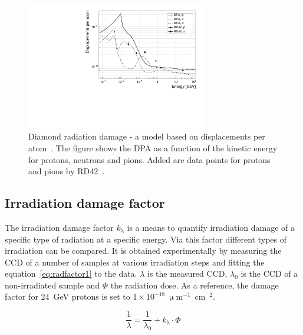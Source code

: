 \begin{figure}[!t]
\begin{center}
\includegraphics[width=0.7\textwidth]{03_measurement_results/scripts/plots/dpa1}
\caption{Diamond radiation damage - a model based on displacements per atom~\cite{Guthoff:2014223}. The figure shows the DPA as a function of the kinetic energy for protons, neutrons and pions. Added are data points for protons and pions by RD42~\cite{RD42IRRAD:00000}. %
}
\label{fig:kitdpa}
\end{center}
\end{figure}

\subsection{Irradiation damage factor}
The irradiation damage factor $k_\uplambda$ is a means to quantify irradiation damage of a specific type of radiation at a specific energy. Via this factor different types of irradiation can be compared. It is obtained experimentally by measuring the CCD of a number of samples at various irradiation steps and fitting the equation~\ref{eq:radfactor1} to the data. $\lambda$ is the measured CCD, $\lambda_\mathrm{0}$ is the CCD of a non-irradiated sample and $\Phi$ the radiation dose. As a reference, the damage factor for 24~GeV protons is set to $1\times10^{-18}~\upmu$m$^{-1}$~cm~$^{2}$.


\begin{equation}
\label{eq:radfactor1}
\frac{1}{\lambda} = \frac{1}{\lambda_\mathrm{0}}+k_\uplambda\cdot\Phi
\end{equation} 





